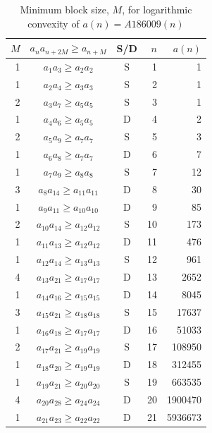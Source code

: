 \documentclass[12pt, oneside]{article}
\numberwithin{equation}{section}
\theoremstyle{definition}
\theoremstyle{plain}
\theoremstyle{remark}
\begin{document}
\begin{table}[htbp]
\centering
\caption{Minimum block size, $M$, for logarithmic convexity of $a(n) = A186009(n)$}
\label{tab:A186009}
\vspace{4pt}
\begin{tabular}{@{}rccrr@{}}
\toprule
$M$ & $a_{n} a_{n+2M} \ge a_{n+M}$ & {S/D} & $n$ & $a(n)$ \\
\midrule
1 & $a_{ 1} a_{ 3} \ge a_{ 2} a_{ 2}$ & S &  1 &            1 \\
1 & $a_{ 2} a_{ 4} \ge a_{ 3} a_{ 3}$ & S &  2 &            1 \\
2 & $a_{ 3} a_{ 7} \ge a_{ 5} a_{ 5}$ & S &  3 &            1 \\
1 & $a_{ 4} a_{ 6} \ge a_{ 5} a_{ 5}$ & D &  4 &            2 \\
2 & $a_{ 5} a_{ 9} \ge a_{ 7} a_{ 7}$ & S &  5 &            3 \\
1 & $a_{ 6} a_{ 8} \ge a_{ 7} a_{ 7}$ & D &  6 &            7 \\
1 & $a_{ 7} a_{ 9} \ge a_{ 8} a_{ 8}$ & S &  7 &           12 \\
3 & $a_{ 8} a_{14} \ge a_{11} a_{11}$ & D &  8 &           30 \\
1 & $a_{ 9} a_{11} \ge a_{10} a_{10}$ & D &  9 &           85 \\
2 & $a_{10} a_{14} \ge a_{12} a_{12}$ & S & 10 &          173 \\
1 & $a_{11} a_{13} \ge a_{12} a_{12}$ & D & 11 &          476 \\
1 & $a_{12} a_{14} \ge a_{13} a_{13}$ & S & 12 &          961 \\
4 & $a_{13} a_{21} \ge a_{17} a_{17}$ & D & 13 &         2652 \\
1 & $a_{14} a_{16} \ge a_{15} a_{15}$ & D & 14 &         8045 \\
3 & $a_{15} a_{21} \ge a_{18} a_{18}$ & S & 15 &        17637 \\
1 & $a_{16} a_{18} \ge a_{17} a_{17}$ & D & 16 &        51033 \\
2 & $a_{17} a_{21} \ge a_{19} a_{19}$ & S & 17 &       108950 \\
1 & $a_{18} a_{20} \ge a_{19} a_{19}$ & D & 18 &       312455 \\
1 & $a_{19} a_{21} \ge a_{20} a_{20}$ & S & 19 &       663535 \\
4 & $a_{20} a_{28} \ge a_{24} a_{24}$ & D & 20 &      1900470 \\
1 & $a_{21} a_{23} \ge a_{22} a_{22}$ & D & 21 &      5936673 \\

\end{tabular}
\end{table}
\end{document}
